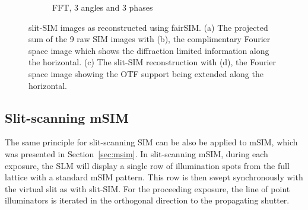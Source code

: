 \begin{figure}[h]
\begin{subfigure}[t]{0.23\textwidth}
      \caption{\gls{FFT}, 3 angles and 3 phases}
  \end{subfigure}
  \caption{slit-SIM images as reconstructed using fairSIM.
  (a) The projected sum of the 9 raw \gls{SIM} images with
  (b), the complimentary Fourier space image which shows the diffraction limited information along the horizontal.
  (c) The slit-SIM reconstruction with (d), the Fourier space image showing the OTF support being extended along the horizontal.
  }\label{fig:sim_slit_reconstructed}
\end{figure}

\subsection{Slit-scanning \gls{mSIM}}

The same principle for \gls{slit-scanning} \gls{SIM} can be also be applied to \gls{mSIM}, which was presented in Section~\ref{sec:msim}.
In \gls{slit-scanning} \gls{mSIM}, during each exposure, the \gls{SLM} will display a single row of illumination spots from the full lattice with a standard \gls{mSIM} pattern.
This row is then swept synchronously with the virtual slit as with slit-\gls{SIM}.
For the proceeding exposure, the line of point illuminators is iterated in the orthogonal direction to the propagating shutter.


